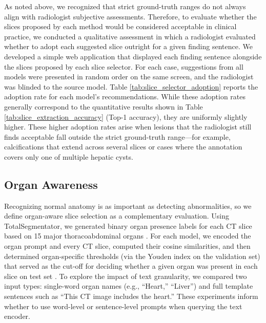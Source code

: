 \documentclass[bioengineering,article,submit,pdftex,moreauthors]{Definitions/mdpi}
\begin{document}
As noted above, we recognized that strict ground-truth ranges do not always align with radiologist subjective assessments.
Therefore, to evaluate whether the slices proposed by each method would be considered acceptable in clinical practice, we conducted a qualitative assessment in which a radiologist evaluated whether to adopt each suggested slice outright for a given finding sentence. 
We developed a simple web application that displayed each finding sentence alongside the slices proposed by each slice selector. 
For each case, suggestions from all models were presented in random order on the same screen, and the radiologist was blinded to the source model. 
Table \ref{tab:slice_selector_adoption} reports the adoption rate for each model’s recommendations. 
While these adoption rates generally correspond to the quantitative results shown in Table \ref{tab:slice_extraction_accuracy} (Top-1 accuracy), they are uniformly slightly higher. 
These higher adoption rates arise when lesions that the radiologist still finds acceptable fall outside the strict ground-truth range—for example, calcifications that extend across several slices or cases where the annotation covers only one of multiple hepatic cysts.


\subsection{Organ Awareness}\label{sec:organ_aware}
Recognizing normal anatomy is as important as detecting abnormalities, so we deﬁne organ-aware slice selection as a complementary evaluation. 
Using TotalSegmentator, we generated binary organ presence labels for each CT slice based on 15 major thoracoabdominal organs \cite{wasserthal_totalsegmentator_2023}. 
For each model, we encoded the organ prompt and every CT slice, computed their cosine similarities, and then determined organ-specific thresholds (via the Youden index on the validation set) that served as the cut-off for deciding whether a given organ was present in each slice on test set \cite{youden_index_1950}. 
To explore the impact of text granularity, we compared two input types: single-word organ names (e.g., “Heart,” “Liver”) and full template sentences such as “This CT image includes the heart.” 
These experiments inform whether to use word-level or sentence-level prompts when querying the text encoder. 
\end{document}
